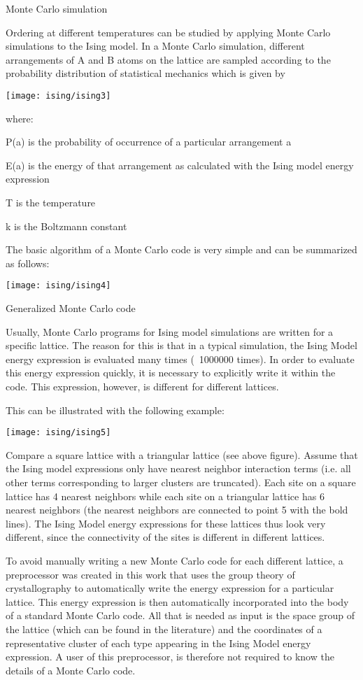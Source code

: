 Monte Carlo simulation

Ordering at different temperatures can be studied by applying Monte
Carlo simulations to the Ising model. In a Monte Carlo simulation,
different arrangements of A and B atoms on the lattice are sampled
according to the probability distribution of statistical mechanics
which is given by

\texttt{[image: ising/ising3]}

where:

P(a) is the probability of occurrence of a particular arrangement a

E(a) is the energy of that arrangement as calculated with the Ising model energy expression

T is the temperature

k is the Boltzmann constant

The basic algorithm of a Monte Carlo code is very simple and can be
summarized as follows:

\texttt{[image: ising/ising4]}

Generalized Monte Carlo code

Usually, Monte Carlo programs for Ising model simulations are written
for a specific lattice. The reason for this is that in a typical
simulation, the Ising Model energy expression is evaluated many times
(~1000000 times). In order to evaluate this energy expression quickly,
it is necessary to explicitly write it within the code. This
expression, however, is different for different lattices.

This can be illustrated with the following example:

\texttt{[image: ising/ising5]}

Compare a square lattice with a triangular lattice (see above
figure). Assume that the Ising model expressions only have nearest
neighbor interaction terms (i.e. all other terms corresponding to
larger clusters are truncated). Each site on a square lattice has 4
nearest neighbors while each site on a triangular lattice has 6
nearest neighbors (the nearest neighbors are connected to point 5 with
the bold lines). The Ising Model energy expressions for these lattices
thus look very different, since the connectivity of the sites is
different in different lattices.

To avoid manually writing a new Monte Carlo code for each different
lattice, a preprocessor was created in this work that uses the group
theory of crystallography to automatically write the energy expression
for a particular lattice. This energy expression is then automatically
incorporated into the body of a standard Monte Carlo code. All that is
needed as input is the space group of the lattice (which can be found
in the literature) and the coordinates of a representative cluster of
each type appearing in the Ising Model energy expression. A user of
this preprocessor, is therefore not required to know the details of a
Monte Carlo code.

